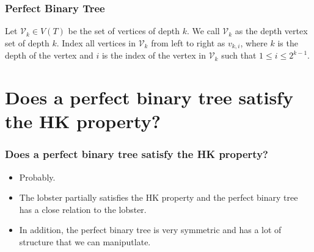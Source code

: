 \documentclass[10pt,]{beamer}
\theoremstyle{mystyle}
\begin{document}
\begin{frame}\frametitle{Perfect Binary Tree}
    \begin{definition}
        Let $\mathcal{V}_k \in V(T)$ be the set of vertices of depth $k$. We call $\mathcal{V}_k$ as the depth vertex set of depth $k$. Index all vertices in $\mathcal{V}_k$ from left to right as $v_{k, i}$, where $k$ is the depth of the vertex and $i$ is the index of the vertex in $\mathcal{V}_k$ such that $1 \leq i \leq 2^{k - 1}$.
    \end{definition}
    \begin{figure}
        \centering
    \end{figure}
\end{frame}

\section{Does a perfect binary tree satisfy the HK property?}
\begin{frame}\frametitle{Does a perfect binary tree satisfy the HK property?}
    \begin{itemize}
        \setlength\itemsep{2em}
        \item Probably.
        \item The lobster partially satisfies the HK property and the perfect binary tree has a close relation to the lobster.
        \item In addition, the perfect binary tree is very symmetric and has a lot of structure that we can maniputlate.
    \end{itemize}
\end{frame}
\end{document}
